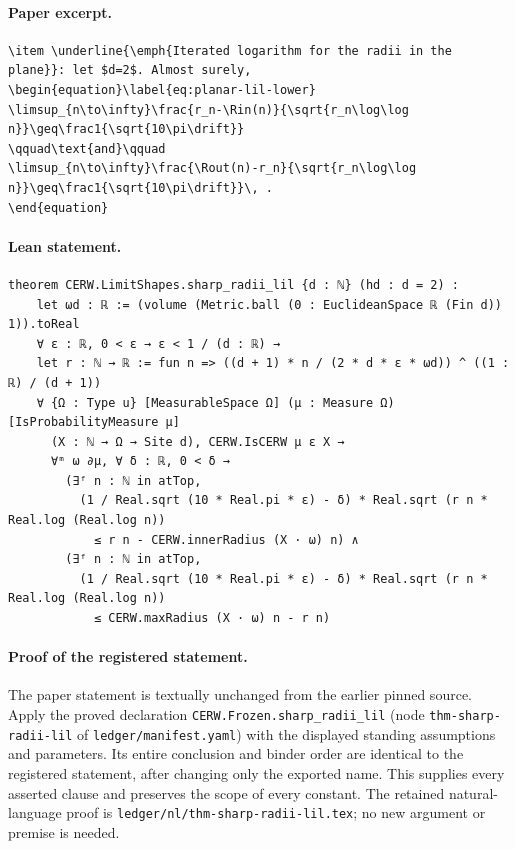 \paragraph{Paper excerpt.}
\begin{verbatim}
\item \underline{\emph{Iterated logarithm for the radii in the plane}}: let $d=2$. Almost surely,
\begin{equation}\label{eq:planar-lil-lower}
\limsup_{n\to\infty}\frac{r_n-\Rin(n)}{\sqrt{r_n\log\log n}}\geq\frac1{\sqrt{10\pi\drift}}
\qquad\text{and}\qquad
\limsup_{n\to\infty}\frac{\Rout(n)-r_n}{\sqrt{r_n\log\log n}}\geq\frac1{\sqrt{10\pi\drift}}\, .
\end{equation}
\end{verbatim}
\paragraph{Lean statement.}
\begin{verbatim}
theorem CERW.LimitShapes.sharp_radii_lil {d : ℕ} (hd : d = 2) :
    let ωd : ℝ := (volume (Metric.ball (0 : EuclideanSpace ℝ (Fin d)) 1)).toReal
    ∀ ε : ℝ, 0 < ε → ε < 1 / (d : ℝ) →
    let r : ℕ → ℝ := fun n => ((d + 1) * n / (2 * d * ε * ωd)) ^ ((1 : ℝ) / (d + 1))
    ∀ {Ω : Type u} [MeasurableSpace Ω] (μ : Measure Ω) [IsProbabilityMeasure μ]
      (X : ℕ → Ω → Site d), CERW.IsCERW μ ε X →
      ∀ᵐ ω ∂μ, ∀ δ : ℝ, 0 < δ →
        (∃ᶠ n : ℕ in atTop,
          (1 / Real.sqrt (10 * Real.pi * ε) - δ) * Real.sqrt (r n * Real.log (Real.log n))
            ≤ r n - CERW.innerRadius (X · ω) n) ∧
        (∃ᶠ n : ℕ in atTop,
          (1 / Real.sqrt (10 * Real.pi * ε) - δ) * Real.sqrt (r n * Real.log (Real.log n))
            ≤ CERW.maxRadius (X · ω) n - r n)
\end{verbatim}
\paragraph{Proof of the registered statement.}
The paper statement is textually unchanged from the earlier pinned source.
Apply the proved declaration \texttt{CERW.Frozen.sharp\_radii\_lil}
(node \texttt{thm-sharp-radii-lil} of \texttt{ledger/manifest.yaml}) with the displayed
standing assumptions and parameters. Its entire conclusion and binder order
are identical to the registered statement, after changing only the exported
name. This supplies every asserted clause and preserves the scope of every
constant. The retained natural-language proof is
\texttt{ledger/nl/thm-sharp-radii-lil.tex}; no new argument or premise is needed.
